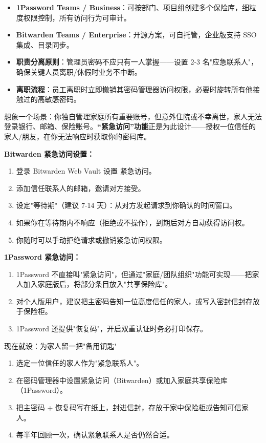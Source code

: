 \begin{itemize}
  \item \textbf{1Password Teams / Business}：可按部门、项目组创建多个保险库，细粒度权限控制，所有访问行为可审计。
  \item \textbf{Bitwarden Teams / Enterprise}：开源方案，可自托管，企业版支持 SSO 集成、目录同步。
  \item \textbf{职责分离原则}：管理员密码不应只有一人掌握——设置 2-3 名"应急联系人"，确保关键人员离职/休假时业务不中断。
  \item \textbf{离职流程}：员工离职时立即撤销其密码管理器访问权限，必要时旋转所有他接触过的高敏感密码。
\end{itemize}


想象一个场景：你独自管理家庭所有重要账号，但意外住院或不幸离世，家人无法登录银行、邮箱、保险账号。\textbf{“紧急访问”功能}正是为此设计——授权一位信任的家人/朋友，在你无法响应时获取你的密码库。

\textbf{Bitwarden 紧急访问设置：}

\begin{enumerate}
  \item 登录 Bitwarden Web Vault 设置 紧急访问。
  \item 添加信任联系人的邮箱，邀请对方接受。
  \item 设定"等待期"（建议 7-14 天）：从对方发起请求到你确认的时间窗口。
  \item 如果你在等待期内不响应（拒绝或不操作），到期后对方自动获得访问权。
  \item 你随时可以手动拒绝请求或撤销紧急访问权限。
\end{enumerate}

\textbf{1Password 紧急访问：}

\begin{enumerate}
  \item 1Password 不直接叫"紧急访问"，但通过"家庭/团队组织"功能可实现——把家人加入家庭版后，将部分条目放入"共享保险库"。
  \item 对个人版用户，建议把主密码告知一位高度信任的家人，或写入密封信封存放于保险柜。
  \item 1Password 还提供"恢复码"，开启双重认证时务必打印保存。
\end{enumerate}

\begin{tcbpractice}{现在就设：为家人留一把"备用钥匙"}
\begin{enumerate}
  \item 选定一位信任的家人作为"紧急联系人"。
  \item 在密码管理器中设置紧急访问（Bitwarden）或加入家庭共享保险库（1Password）。
  \item 把主密码 + 恢复码写在纸上，封进信封，存放于家中保险柜或告知可信家人。
  \item 每半年回顾一次，确认紧急联系人是否仍然合适。
\end{enumerate}

\end{tcbpractice}

